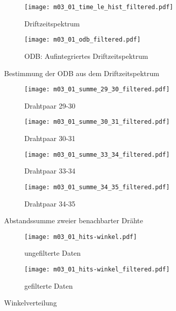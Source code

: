 \documentclass[11pt, ngerman, fleqn, DIV=15, headinclude, BCOR=2cm]{scrreprt}
\begin{document}
\begin{figure}
	\centering
	\begin{subfigure}{0.49 \linewidth}
		\texttt{[image: m03\_01\_time\_le\_hist\_filtered.pdf]}
		\caption{%
			Driftzeitspektrum
		}
		\label{fig:m03_time_le_hist_filtered}
	\end{subfigure}
	\begin{subfigure}{0.49 \linewidth}
		\texttt{[image: m03\_01\_odb\_filtered.pdf]}
		\caption{%
			ODB: Aufintegriertes Driftzeitspektrum
		}
		\label{fig:m03_odb_filtered}
	\end{subfigure}
	\caption{%
		Bestimmung der ODB aus dem Driftzeitspektrum
	}
	\label{fig:m03_odb_bestimmung}
\end{figure}

\begin{figure}
	\centering
	\begin{subfigure}{0.49 \linewidth}
		\texttt{[image: m03\_01\_summe\_29\_30\_filtered.pdf]}
		\caption{%
			Drahtpaar 29-30
		}
		\label{fig:m03_summe_29_30}
	\end{subfigure}
	\begin{subfigure}{0.49 \linewidth}
		\texttt{[image: m03\_01\_summe\_30\_31\_filtered.pdf]}
		\caption{%
			Drahtpaar 30-31
		}
		\label{fig:m03_summe_30_31}
	\end{subfigure}
	\begin{subfigure}{0.49 \linewidth}
		\texttt{[image: m03\_01\_summe\_33\_34\_filtered.pdf]}
		\caption{%
			Drahtpaar 33-34
		}
		\label{fig:m03_summe_33_34}
	\end{subfigure}
	\begin{subfigure}{0.49 \linewidth}
		\texttt{[image: m03\_01\_summe\_34\_35\_filtered.pdf]}
		\caption{%
			Drahtpaar 34-35
		}
		\label{fig:m03_summe_34_35}
	\end{subfigure}
\caption{%
		Abstandssumme zweier benachbarter Drähte
	}
	\label{fig:m03_ort_driftzeit}
\end{figure}

\begin{figure}
	\centering
	\begin{subfigure}{0.49 \linewidth}
		\texttt{[image: m03\_01\_hits-winkel.pdf]}
		\caption{%
			ungefilterte Daten
		}
		\label{fig:m03_hits-winkel}
	\end{subfigure}
	\begin{subfigure}{0.49 \linewidth}
		\texttt{[image: m03\_01\_hits-winkel\_filtered.pdf]}
		\caption{%
			gefilterte Daten
		}
		\label{fig:m03_hits-winkel_filtered}
	\end{subfigure}
	\caption{%
		Winkelverteilung
	}
	\label{fig:m03_winkelverteilung}
\end{figure}
\end{document}
